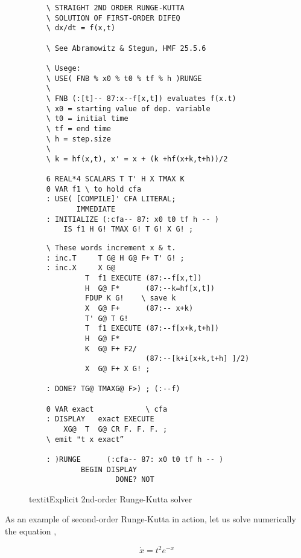 \begin{figure}
    \tiny
    \begin{tcolorbox} [sidebyside, colback=white, sharp corners, enhanced, segmentation style=solid]
    \begin{lstlisting}
    \ STRAIGHT 2ND ORDER RUNGE-KUTTA
    \ SOLUTION OF FIRST-ORDER DIFEQ
    \ dx/dt = f(x,t)

    \ See Abramowitz & Stegun, HMF 25.5.6

    \ Usege:
    \ USE( FNB % x0 % t0 % tf % h )RUNGE
    \
    \ FNB (:[t]-- 87:x--f[x,t]) evaluates f(x.t)
    \ x0 = starting value of dep. variable
    \ t0 = initial time
    \ tf = end time
    \ h = step.size
    \
    \ k = hf(x,t), x' = x + (k +hf(x+k,t+h))/2

    6 REAL*4 SCALARS T T' H X TMAX K
    0 VAR f1 \ to hold cfa
    : USE( [COMPILE]' CFA LITERAL;
           IMMEDIATE
    : INITIALIZE (:cfa-- 87: x0 t0 tf h -- )
        IS f1 H G! TMAX G! T G! X G! ;
    \end{lstlisting}
\tcblower
    \begin{lstlisting}
    \ These words increment x & t.
    : inc.T     T G@ H G@ F+ T' G! ;
    : inc.X     X G@
             T  f1 EXECUTE (87:--f[x,t])
             H  G@ F*      (87:--k=hf[x,t])
             FDUP K G!    \ save k
             X  G@ F+      (87:-- x+k)
             T' G@ T G!
             T  f1 EXECUTE (87:--f[x+k,t+h])
             H  G@ F*
             K  G@ F+ F2/
                           (87:--[k+i[x+k,t+h] ]/2)
             X  G@ F+ X G! ;

    : DONE? TG@ TMAXG@ F>) ; (:--f)

    0 VAR exact            \ cfa
    : DISPLAY   exact EXECUTE
        XG@  T  G@ CR F. F. F. ;
    \ emit "t x exact”

    : )RUNGE      (:cfa-- 87: x0 t0 tf h -- )
            BEGIN DISPLAY
                    DONE? NOT
    \end{lstlisting}
\end{tcolorbox}
    \caption{textit{Explicit 2nd-order Runge-Kutta solver}}
\label{fig:06_07}
\end{figure}

As an example of second-order Runge-Kutta in action, let us solve numerically the equation ,

\begin{equation}
    \dot{x} = t^2 e^{-x}
    \label{eq:06_21} 
\end{equation}

